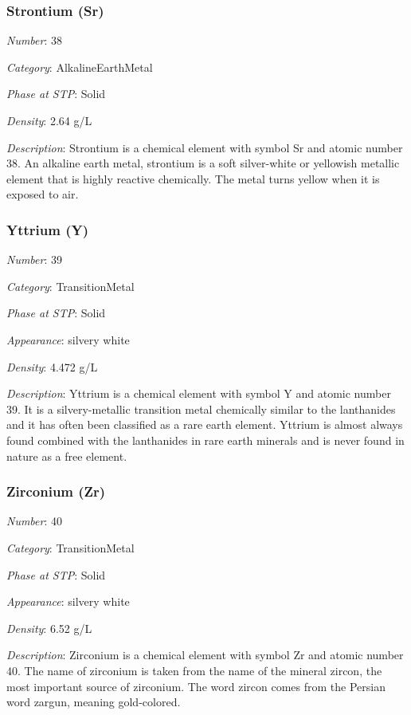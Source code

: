 \documentclass{article}
\begin{document}
\hypertarget{subsubsection::Sr}{}\subsubsection{Strontium (Sr)}

\textit{Number}: 38

\textit{Category}: AlkalineEarthMetal

\textit{Phase at STP}: Solid

\textit{Density}: 2.64 g/L

\textit{Description}: Strontium is a chemical element with symbol Sr and atomic number 38. An alkaline earth metal, strontium is a soft silver-white or yellowish metallic element that is highly reactive chemically. The metal turns yellow when it is exposed to air.

\hypertarget{subsubsection::Y}{}\subsubsection{Yttrium (Y)}

\textit{Number}: 39

\textit{Category}: TransitionMetal

\textit{Phase at STP}: Solid

\textit{Appearance}: silvery white

\textit{Density}: 4.472 g/L

\textit{Description}: Yttrium is a chemical element with symbol Y and atomic number 39. It is a silvery-metallic transition metal chemically similar to the lanthanides and it has often been classified as a rare earth element. Yttrium is almost always found combined with the lanthanides in rare earth minerals and is never found in nature as a free element.

\hypertarget{subsubsection::Zr}{}\subsubsection{Zirconium (Zr)}

\textit{Number}: 40

\textit{Category}: TransitionMetal

\textit{Phase at STP}: Solid

\textit{Appearance}: silvery white

\textit{Density}: 6.52 g/L

\textit{Description}: Zirconium is a chemical element with symbol Zr and atomic number 40. The name of zirconium is taken from the name of the mineral zircon, the most important source of zirconium. The word zircon comes from the Persian word zargun, meaning gold-colored.
\end{document}
